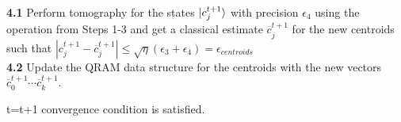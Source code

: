 \documentclass{article}
\newcommand{\errnorms}{\epsilon_3}
\newcommand{\errtom}{\epsilon_4}
\newcommand{\norm}[1]{\left\lVert#1\right\rVert}
\begin{document}
\begin{algorithm}
\begin{algorithmic}[1]
	 \\
	{\bf 4.1} Perform tomography for the states $\ket{c_{j}^{t+1}}$
	with precision $\errtom$ using the operation from Steps 1-3  and get a classical estimate $\overline{c}_j^{t+1}$ for the new centroids such that $|c_j^{t+1} - \overline{c}_j^{t+1}| \leq \sqrt{\eta}(\errnorms+\errtom) = \epsilon_{centroids}$\\ %
	{\bf 4.2} Update the QRAM data structure for the centroids with the new vectors $\overline{c}^{t+1}_0 \cdots \overline{c}^{t+1}_k$.

	\Statex t=t+1
	\Until convergence condition is satisfied.

	\end{algorithmic}
	\end{algorithm}
\end{document}
